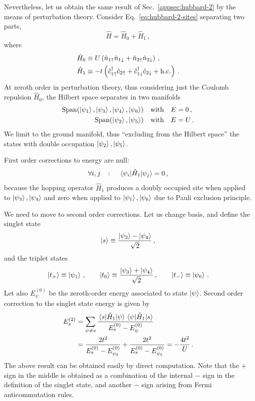 Nevertheless, let us obtain the same result of Sec.~\ref{appsec:hubbard-2} by the means of perturbation theory. Consider Eq.~\eqref{eq:hubbard-2-sites} separating two parts,
\[
	\hat H = \hat H_0 + \hat H_1 \, ,
\]
where
\[	
\begin{aligned}
	\hat H_0 &\equiv U \left(
	\hat n_{1\uparrow} \hat n_{1\downarrow} + \hat n_{2\uparrow} \hat n_{2\downarrow} 
	\right) \, , \\
	\hat H_1 &\equiv -t \left(
	\hat c_{1\uparrow}^\dagger \hat c_{2\uparrow} + \hat c_{1\downarrow}^\dagger \hat c_{2\downarrow} + \mathrm{h.c.} 
	\right) \, .
\end{aligned}
\]
At zeroth order in perturbation theory, thus considering just the Coulomb repulsion $\hat H_0$, the Hilbert space separates in two manifolds
\[
\begin{aligned}
	\mathrm{Span}(\ket{\psi_1},\ket{\psi_3},\ket{\psi_4},\ket{\psi_6}) \qq{with} & E = 0 \, , \\
	\mathrm{Span}(\ket{\psi_2},\ket{\psi_5}) \qq{with} & E = U \, .
\end{aligned}
\]
We limit to the ground manifold, thus ``excluding from the Hilbert space'' the states with double occupation $\ket{\psi_2}, \ket{\psi_5}$.

First order corrections to energy are null:
\[
	\forall i,j
	\quad\colon\quad
	\mel{\psi_i}{\hat H_1}{\psi_j} = 0 \, ,
\]
because the hopping operator $\hat H_1$ produces a doubly occupied site when applied to $\ket{\psi_3}, \ket{\psi_4}$ and zero when applied to $\ket{\psi_1}, \ket{\psi_6}$ due to Pauli exclusion principle.

We need to move to second order corrections. Let us change basis, and define the singlet state
\[
	\ket{s} \equiv \frac{\ket{\psi_3} - \ket{\psi_4}}{\sqrt{2}} \, ,
\]
and the triplet states
\[
	\ket{t_+} \equiv \ket{\psi_1} \, ,
	\qquad
	\ket{t_0} \equiv \frac{\ket{\psi_3} +  \ket{\psi_4}}{\sqrt{2}} \, ,
	\qquad
	\ket{t_-} \equiv \ket{\psi_6} \, .
\]
Let also $E_\psi^{(0)}$ be the zeroth-order energy associated to state $\ket{\psi}$. Second order correction to the singlet state energy is given by
\[
\begin{aligned}
	E_s^{(2)} &= \sum_{\psi \neq s} \frac{\mel{s}{\hat H_1}{\psi}\mel{\psi}{\hat H_1}{s}}{E_s^{(0)} - E_\psi^{(0)}} \\
	&= \frac{2t^2}{E_s^{(0)} - E_{\psi_2}^{(0)}} + \frac{2t^2}{E_s^{(0)} - E_{\psi_5}^{(0)}} = - \frac{4t^2}{U} \, .
\end{aligned}
\]
The above result can be obtained easily by direct computation. Note that the $+$ sign in the middle is obtained as a combination of the internal $-$ sign in the definition of the singlet state, and another $-$ sign arising from Fermi anticommutation rules. 

